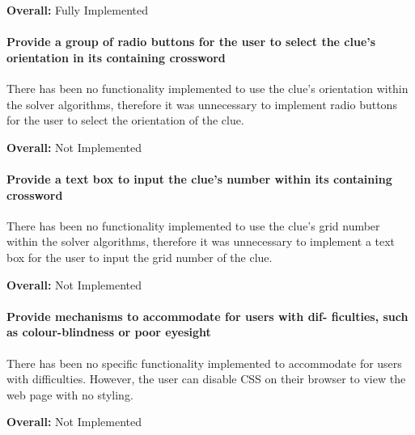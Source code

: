 {\bf Overall:} Fully Implemented

\paragraph{Provide a group of radio buttons for the user to select
the clue's orientation in its containing crossword}

There has been no functionality implemented to use the clue's orientation 
within the solver algorithms, therefore it was unnecessary to implement 
radio buttons for the user to select the orientation of the clue. 

{\bf Overall:} Not Implemented

\paragraph{Provide a text box to input the clue's number within its
containing crossword}

There has been no functionality implemented to use the clue's grid number 
within the solver algorithms, therefore it was unnecessary to implement 
a text box for the user to input the grid number of the clue. 
 
{\bf Overall:} Not Implemented

\paragraph{Provide mechanisms to accommodate for users with dif-
ficulties, such as colour-blindness or poor eyesight}
    
There has been no specific functionality implemented to accommodate for 
users with difficulties. However, the user can disable CSS on their browser
 to view the web page with no styling. 

{\bf Overall:} Not Implemented